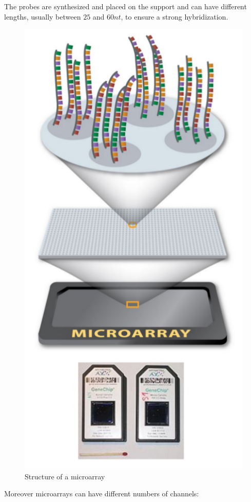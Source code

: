 	The probes are synthesized and placed on the support and can have different lengths, usually between $25$ and $60nt$, to ensure a strong hybridization.

\begin{figure}[H]
			\centering
			\includegraphics[scale=0.2]{microarray.png}
			\caption{Structure of a microarray}
			\label{fig:microarray}
			\end{figure}

	Moreover microarrays can have different numbers of channels:

